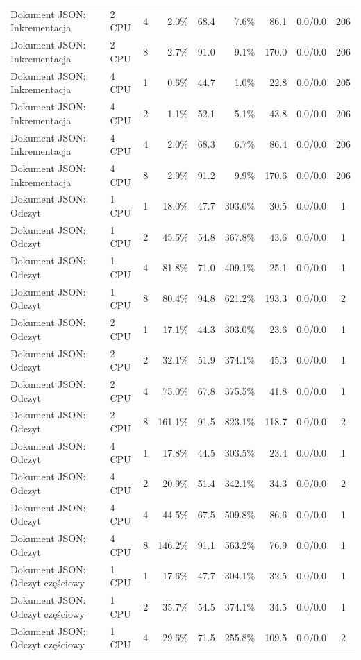 \begin{table}[ht]
{\begin{tabular}{llcrrrrcc}
Dokument JSON: Inkrementacja & 2 CPU & 4 & 2.0\% & 68.4 & 7.6\% & 86.1 & 0.0/0.0 & 206 \\
Dokument JSON: Inkrementacja & 2 CPU & 8 & 2.7\% & 91.0 & 9.1\% & 170.0 & 0.0/0.0 & 206 \\
Dokument JSON: Inkrementacja & 4 CPU & 1 & 0.6\% & 44.7 & 1.0\% & 22.8 & 0.0/0.0 & 205 \\
Dokument JSON: Inkrementacja & 4 CPU & 2 & 1.1\% & 52.1 & 5.1\% & 43.8 & 0.0/0.0 & 206 \\
Dokument JSON: Inkrementacja & 4 CPU & 4 & 2.0\% & 68.3 & 6.7\% & 86.4 & 0.0/0.0 & 206 \\
Dokument JSON: Inkrementacja & 4 CPU & 8 & 2.9\% & 91.2 & 9.9\% & 170.6 & 0.0/0.0 & 206 \\
Dokument JSON: Odczyt & 1 CPU & 1 & 18.0\% & 47.7 & 303.0\% & 30.5 & 0.0/0.0 & 1 \\
Dokument JSON: Odczyt & 1 CPU & 2 & 45.5\% & 54.8 & 367.8\% & 43.6 & 0.0/0.0 & 1 \\
Dokument JSON: Odczyt & 1 CPU & 4 & 81.8\% & 71.0 & 409.1\% & 25.1 & 0.0/0.0 & 1 \\
Dokument JSON: Odczyt & 1 CPU & 8 & 80.4\% & 94.8 & 621.2\% & 193.3 & 0.0/0.0 & 2 \\
Dokument JSON: Odczyt & 2 CPU & 1 & 17.1\% & 44.3 & 303.0\% & 23.6 & 0.0/0.0 & 1 \\
Dokument JSON: Odczyt & 2 CPU & 2 & 32.1\% & 51.9 & 374.1\% & 45.3 & 0.0/0.0 & 1 \\
Dokument JSON: Odczyt & 2 CPU & 4 & 75.0\% & 67.8 & 375.5\% & 41.8 & 0.0/0.0 & 1 \\
Dokument JSON: Odczyt & 2 CPU & 8 & 161.1\% & 91.5 & 823.1\% & 118.7 & 0.0/0.0 & 2 \\
Dokument JSON: Odczyt & 4 CPU & 1 & 17.8\% & 44.5 & 303.5\% & 23.4 & 0.0/0.0 & 1 \\
Dokument JSON: Odczyt & 4 CPU & 2 & 20.9\% & 51.4 & 342.1\% & 34.3 & 0.0/0.0 & 2 \\
Dokument JSON: Odczyt & 4 CPU & 4 & 44.5\% & 67.5 & 509.8\% & 86.6 & 0.0/0.0 & 1 \\
Dokument JSON: Odczyt & 4 CPU & 8 & 146.2\% & 91.1 & 563.2\% & 76.9 & 0.0/0.0 & 1 \\
Dokument JSON: Odczyt częściowy & 1 CPU & 1 & 17.6\% & 47.7 & 304.1\% & 32.5 & 0.0/0.0 & 1 \\
Dokument JSON: Odczyt częściowy & 1 CPU & 2 & 35.7\% & 54.5 & 374.1\% & 34.5 & 0.0/0.0 & 1 \\
Dokument JSON: Odczyt częściowy & 1 CPU & 4 & 29.6\% & 71.5 & 255.8\% & 109.5 & 0.0/0.0 & 2 \\

\end{tabular}}
\end{table}
